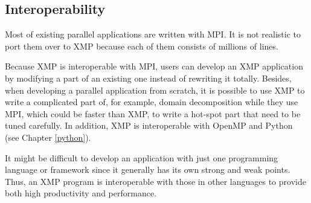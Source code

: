 


\subsection{Interoperability}

Most of existing parallel applications are written with MPI. It is not
realistic to port them over to XMP because each of them consists of
millions of lines.

Because XMP is interoperable with MPI, users can develop an XMP
application by modifying a part of an existing one instead of rewriting
it totally. Besides, when developing a parallel application from
scratch, it is possible to use XMP to write a complicated part of, for
example, domain decomposition while they use MPI, which could be faster
than XMP, to write a hot-spot part that need to be tuned carefully. In
addition, XMP is interoperable with OpenMP and Python (see Chapter
\ref{python}).

It might be difficult to develop an application with just one
programming language or framework since it generally has its own strong
and weak points. Thus, an XMP program is interoperable with those in
other languages to provide both high productivity and performance.